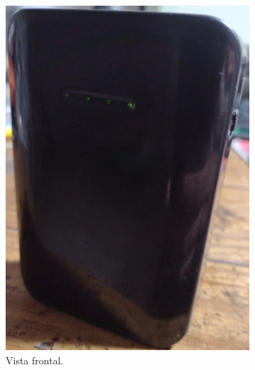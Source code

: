 \documentclass[11pt,a4paper]{article}
\begin{document}
	\begin{figure}[h!]
		\centering
		\begin{subfigure}{0.3\textwidth}
			\includegraphics[width=\textwidth]{imagenes/battery_pack1.jpg}
			\caption{Vista frontal.}
		\end{subfigure}
		\hfill
		\begin{subfigure}{0.3\textwidth}

\end{subfigure}
\end{figure}
\end{document}
